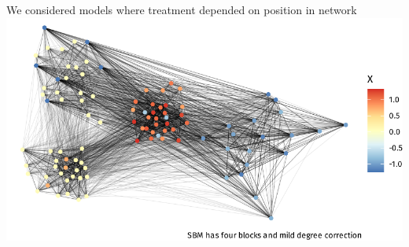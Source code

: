 \documentclass[aspectratio=169]{beamer}
\theoremstyle{remark}
\begin{document}
\begin{frame}{We considered models where treatment depended on position in network}
    \centering
    \includegraphics{./figures/simulations/defense-backbone-dependent.pdf}
\end{frame}
\end{document}

